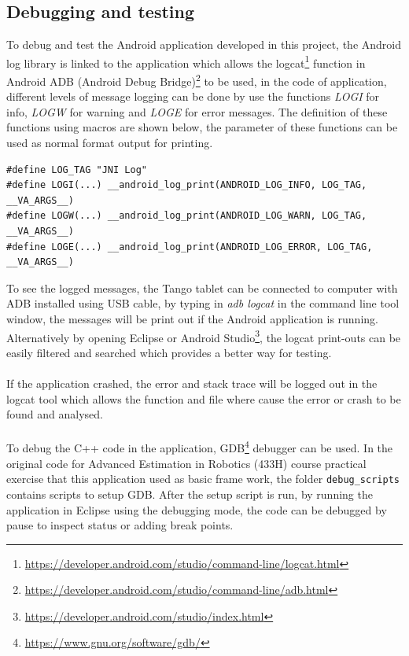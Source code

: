 \documentclass[12pt,twoside]{article}
\begin{document}
\subsection{Debugging and testing}
To debug and test the Android application developed in this project, the Android log library is linked to the application which allows the logcat\footnote{\url{https://developer.android.com/studio/command-line/logcat.html}} function in Android ADB (Android Debug Bridge)\footnote{\url{https://developer.android.com/studio/command-line/adb.html}} to be used, in the code of application, different levels of message logging can be done by use the functions \textit{LOGI} for info, \textit{LOGW} for warning and \textit{LOGE} for error messages. The definition of these functions using macros are shown below, the parameter of these functions can be used as normal format output for printing.
\begin{lstlisting}
#define LOG_TAG "JNI Log"
#define LOGI(...) __android_log_print(ANDROID_LOG_INFO, LOG_TAG, __VA_ARGS__)
#define LOGW(...) __android_log_print(ANDROID_LOG_WARN, LOG_TAG, __VA_ARGS__)
#define LOGE(...) __android_log_print(ANDROID_LOG_ERROR, LOG_TAG, __VA_ARGS__)
\end{lstlisting}
To see the logged messages, the Tango tablet can be connected to computer with ADB installed using USB cable, by typing in \textit{adb logcat} in the command line tool window, the messages will be print out if the Android application is running. Alternatively by opening Eclipse or Android Studio\footnote{\url{https://developer.android.com/studio/index.html}}, the logcat print-outs can be easily filtered and searched which provides a better way for testing.\\
\\
If the application crashed, the error and stack trace will be logged out in the logcat tool which allows the function and file where cause the error or crash to be found and analysed.\\
\\
To debug the C++ code in the application, GDB\footnote{\url{https://www.gnu.org/software/gdb/}} debugger can be used. In the original code for Advanced Estimation in Robotics (433H) course practical exercise that this application used as basic frame work, the folder \verb|debug_scripts| contains scripts to setup GDB. After the setup script is run, by running the application in Eclipse using the debugging mode, the code can be debugged by pause to inspect status or adding break points.\\
\end{document}
